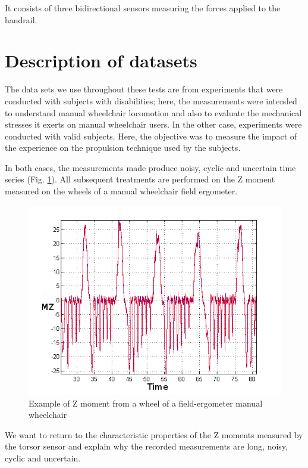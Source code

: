 It consists of three bidirectional sensors measuring the forces applied to the handrail.

\section{Description of  datasets}
The data sets we use throughout these tests are from experiments that were conducted with subjects with disabilities; here, the measurements were intended to understand manual wheelchair locomotion and also to evaluate the mechanical stresses it exerts on manual wheelchair users. In the other case, experiments were conducted with valid subjects. Here, the objective was to measure the impact of the experience on the propulsion technique used by the subjects. 


In both cases, the measurements made produce noisy, cyclic and uncertain time series (Fig. \ref{TWMWC}). All subsequent treatments are performed on the Z moment measured on the wheels of a manual wheelchair field ergometer.

\begin{figure}[h]
\center
\includegraphics[scale = 0.5]{images/TSMWC}
\caption{Example of Z moment from a wheel of a  field-ergometer manual wheelchair}
\label{TWMWC}
\end{figure}


We want to return to the characteristic properties of the Z moments measured by the torsor sensor and explain why the recorded measurements are long, noisy, cyclic and uncertain.

